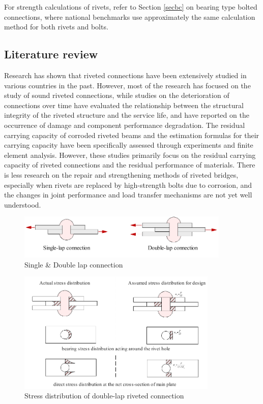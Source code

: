 For strength calculations of rivets, refer to Section \ref{secbc} on bearing type bolted connections, where national benchmarks use approximately the same calculation method for both rivets and bolts.


\subsection{Literature review}

Research has shown that riveted connections have been extensively studied in various countries in the past. However, most of the research has focused on the study of sound riveted connections, while studies on the deterioration of connections over time have evaluated the relationship between the structural integrity of the riveted structure and the service life, and have reported on the occurrence of damage and component performance degradation. The residual carrying capacity of corroded riveted beams and the estimation formulas for their carrying capacity have been specifically assessed through experiments and finite element analysis. However, these studies primarily focus on the residual carrying capacity of riveted connections and the residual performance of materials. There is less research on the repair and strengthening methods of riveted bridges, especially when rivets are replaced by high-strength bolts due to corrosion, and the changes in joint performance and load transfer mechanisms are not yet well understood.

\begin{figure}[htbp]
    \centering
    \includegraphics[width=0.9\textwidth]{imgs/ch2/lap-connec.pdf}
    \caption{Single \& Double lap connection}
    \label{fig-lapconnec}
\end{figure}


\begin{figure}[htbp]
    \centering
    \includegraphics[width=0.85\textwidth]{imgs/ch2/bstressdistr-0.pdf}
    \caption{Stress distribution of double-lap riveted connection}
    \label{fig-rsdisri}
\end{figure}





